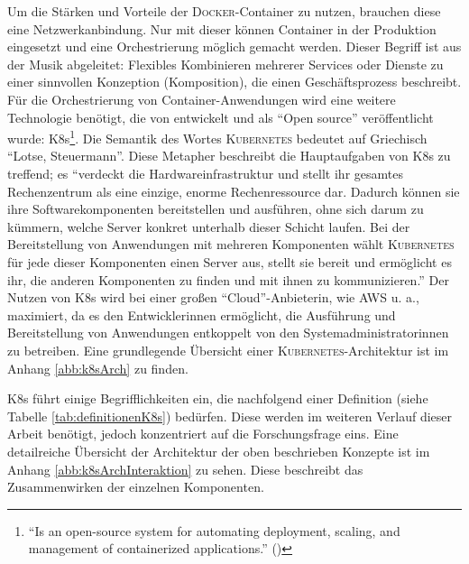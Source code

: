 Um die Stärken und Vorteile der \textsc{Docker}-Container zu nutzen, brauchen diese eine Netzwerkanbindung. Nur mit dieser können Container in der Produktion eingesetzt und eine Orchestrierung möglich gemacht werden. Dieser Begriff ist aus der Musik abgeleitet: Flexibles Kombinieren mehrerer Services oder Dienste zu einer sinnvollen Konzeption (Komposition), die einen Geschäftsprozess beschreibt. Für die Orchestrierung von Container-Anwendungen wird eine weitere Technologie benötigt, die von \cite{google_llc_production-grade_2020} entwickelt und als \enquote{Open source} veröffentlicht wurde: \ac{K8s}\footnote{\enquote{Is an open-source system for automating deployment, scaling, and management of containerized applications.} (\cite{google_llc_production-grade_2020})}. Die Semantik des Wortes \textsc{Kubernetes} bedeutet auf Griechisch \enquote{Lotse, Steuermann}. Diese Metapher beschreibt die Hauptaufgaben von \ac{K8s} zu treffend; es \enquote{verdeckt die Hardwareinfrastruktur und stellt ihr gesamtes Rechenzentrum als eine einzige, enorme Rechenressource dar. Dadurch können sie ihre Softwarekomponenten	bereitstellen und ausführen, ohne sich darum zu kümmern, welche Server konkret unterhalb dieser Schicht laufen. Bei der Bereitstellung von Anwendungen mit mehreren Komponenten wählt \textsc{Kubernetes} für jede dieser Komponenten einen Server aus, stellt sie bereit und ermöglicht es ihr, die anderen Komponenten zu finden und mit ihnen zu kommunizieren.}\autocite[][S.\,4]{luksa_kubernetes_2018} Der Nutzen von \ac{K8s} wird bei einer großen \enquote{Cloud}-Anbieterin, wie \ac{AWS} u. a., maximiert, da es den Entwicklerinnen ermöglicht, die Ausführung und Bereitstellung von Anwendungen entkoppelt von den Systemadministratorinnen zu betreiben.\autocite[vgl.][S.\,4]{luksa_kubernetes_2018} Eine grundlegende Übersicht einer \textsc{Kubernetes}-Architektur ist im Anhang \vref{abb:k8sArch} zu finden.
\par
\ac{K8s} führt einige Begrifflichkeiten ein, die nachfolgend einer Definition\autocite[][S.\,10-14]{caban_architecting_2019} (siehe Tabelle \ref{tab:definitionenK8s}) bedürfen. Diese werden im weiteren Verlauf dieser Arbeit benötigt, jedoch konzentriert auf die Forschungsfrage eins. Eine detailreiche Übersicht der Architektur der oben beschrieben Konzepte ist im Anhang \vref{abb:k8sArchInteraktion} zu sehen. Diese beschreibt das Zusammenwirken der einzelnen Komponenten.
\par

